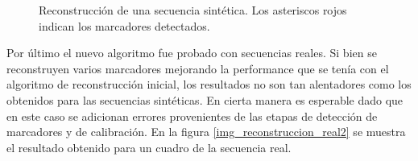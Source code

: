 \begin{figure}[!ht]
   \caption{Reconstrucción de una secuencia sintética. Los asteriscos rojos indican los marcadores detectados.} 
   \label{img_reconstruccion_sintetica}    
\end{figure} 

Por último el nuevo algoritmo fue probado con secuencias reales. Si bien se reconstruyen varios marcadores mejorando la performance que se tenía con el algoritmo de reconstrucción inicial, los resultados no son tan alentadores como los obtenidos para las secuencias sintéticas. En cierta manera es esperable dado que en este caso se adicionan errores provenientes de las etapas de detección de marcadores y de calibración. En la figura \ref{img_reconstruccion_real2} se muestra el resultado obtenido para un cuadro de la secuencia real. 

\begin{figure}[!ht]
   \centering 
    \hspace{0.8cm}
    \hspace{2cm}

\end{figure}

